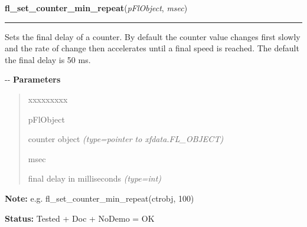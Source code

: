 \hspace{.8\funcindent}\begin{boxedminipage}{\funcwidth}

    \raggedright \textbf{fl\_set\_counter\_min\_repeat}(\textit{pFlObject}, \textit{msec})

    \vspace{-1.5ex}

    \rule{\textwidth}{0.5\fboxrule}
\setlength{\parskip}{2ex}

Sets the final delay of a counter. By default the counter value
changes first slowly and the rate of change then accelerates until
a final speed is reached. The default the final delay is 50 ms.

-{}-
\setlength{\parskip}{1ex}
      \textbf{Parameters}
      \vspace{-1ex}

      \begin{quote}
        \begin{Ventry}{xxxxxxxxx}

          \item[pFlObject]


counter object
            {\it (type=pointer to xfdata.FL\_OBJECT)}

          \item[msec]


final delay in milliseconds
            {\it (type=int)}

        \end{Ventry}

      \end{quote}

\textbf{Note:} 
e.g. fl\_set\_counter\_min\_repeat(ctrobj, 100)


\textbf{Status:} 
Tested + Doc + NoDemo = OK


    \end{boxedminipage}

    \label{xformslib:flcounter:fl_get_counter_speedjump}

    \vspace{0.5ex}

